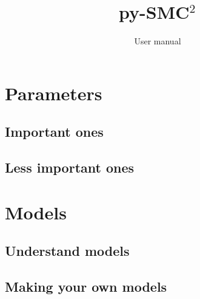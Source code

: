 \documentclass[a4paper,10pt]{paper}
\title{py-SMC$^2$}
\author{User manual}
\begin{document}
 \maketitle
\tableofcontents



\section{Parameters}

\subsection{Important ones}

\subsection{Less important ones}

\section{Models}

\subsection{Understand models}

\subsection{Making your own models}
\end{document}
